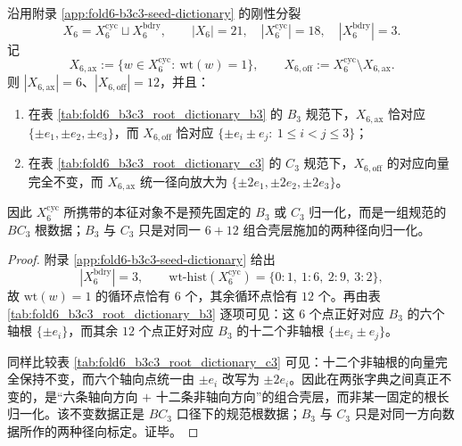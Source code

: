 \begin{theorem}\label{thm:xi-window6-cyclic-kernel-bc3-root-datum}
沿用附录 \ref{app:fold6-b3c3-seed-dictionary} 的刚性分裂
\[
X_6=X_6^{\mathrm{cyc}}\sqcup X_6^{\mathrm{bdry}},
\qquad
|X_6|=21,\quad |X_6^{\mathrm{cyc}}|=18,\quad |X_6^{\mathrm{bdry}}|=3.
\]
记
\[
X_{6,\mathrm{ax}}
:=
\{w\in X_6^{\mathrm{cyc}}:\ \mathrm{wt}(w)=1\},
\qquad
X_{6,\mathrm{off}}
:=
X_6^{\mathrm{cyc}}\setminus X_{6,\mathrm{ax}}.
\]
则 \(|X_{6,\mathrm{ax}}|=6\)、\(|X_{6,\mathrm{off}}|=12\)，并且：
\begin{enumerate}
  \item 在表 \ref{tab:fold6_b3c3_root_dictionary_b3} 的 \(B_3\) 规范下，\(X_{6,\mathrm{ax}}\) 恰对应
  \(\{\pm e_1,\pm e_2,\pm e_3\}\)，而 \(X_{6,\mathrm{off}}\) 恰对应
  \(\{\pm e_i\pm e_j:\ 1\le i<j\le 3\}\)；
  \item 在表 \ref{tab:fold6_b3c3_root_dictionary_c3} 的 \(C_3\) 规范下，\(X_{6,\mathrm{off}}\) 的对应向量完全不变，而 \(X_{6,\mathrm{ax}}\) 统一径向放大为
  \(\{\pm 2e_1,\pm 2e_2,\pm 2e_3\}\)。
\end{enumerate}
因此 \(X_6^{\mathrm{cyc}}\) 所携带的本征对象不是预先固定的 \(B_3\) 或 \(C_3\) 归一化，而是一组规范的 \(BC_3\) 根数据；\(B_3\) 与 \(C_3\) 只是对同一 \(6+12\) 组合壳层施加的两种径向归一化。
\end{theorem}
\begin{proof}
附录 \ref{app:fold6-b3c3-seed-dictionary} 给出
\[
|X_6^{\mathrm{bdry}}|=3,
\qquad
\mathrm{wt}\text{-hist}(X_6^{\mathrm{cyc}})=\{0:1,\ 1:6,\ 2:9,\ 3:2\},
\]
故 \(\mathrm{wt}(w)=1\) 的循环点恰有 \(6\) 个，其余循环点恰有 \(12\) 个。再由表
\ref{tab:fold6_b3c3_root_dictionary_b3} 逐项可见：这 \(6\) 个点正好对应 \(B_3\) 的六个轴根
\(\{\pm e_i\}\)，而其余 \(12\) 个点正好对应 \(B_3\) 的十二个非轴根
\(\{\pm e_i\pm e_j\}\)。

同样比较表 \ref{tab:fold6_b3c3_root_dictionary_c3} 可见：十二个非轴根的向量完全保持不变，而六个轴向点统一由 \(\pm e_i\) 改写为 \(\pm 2e_i\)。因此在两张字典之间真正不变的，是“六条轴向方向 \(+\) 十二条非轴向方向”的组合壳层，而非某一固定的根长归一化。该不变数据正是 \(BC_3\) 口径下的规范根数据；\(B_3\) 与 \(C_3\) 只是对同一方向数据所作的两种径向标定。证毕。
\end{proof}

